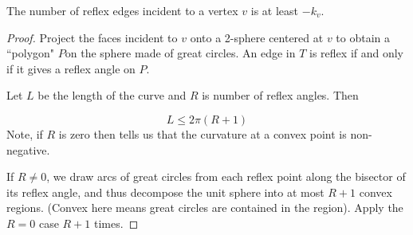 \begin{lemma}\label{lem:reflex-edge}
The number of reflex edges  incident to a vertex $v$  is at least $-k_v.$
\end{lemma}

\begin{proof}
Project the faces incident to $v$ onto a 2-sphere centered at $v$
to obtain a ``polygon" $P$on the sphere made  of great circles.
An edge in $T$ is reflex if and only if it gives  a reflex angle on $P$.

Let $L$ be the length of the curve and $R$ is  number of reflex  angles.
Then

\begin{equation} \label{eqn:length-reflex}
L\leq 2\pi (R+1)
\end{equation}
Note, if $R$ is zero then 
tells us that the curvature at a convex point is non-negative.

If $R\neq 0$, we draw arcs of great circles from each reflex point
along the bisector of its reflex angle, and thus decompose the unit sphere
into at most $R+1$ convex regions. (Convex here means
great circles are contained in the region).
Apply the $R=0$ case $R+1$ times.

\end{proof}



